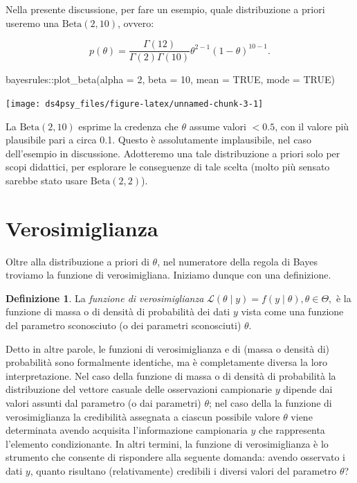 \documentclass[
  11pt,
]{krantz}
\makeatletter
\newenvironment{Shaded}{\begin{snugshade}}{\end{snugshade}}
\newcommand{\AttributeTok}[1]{\textcolor[rgb]{0.61,0.61,0.61}{#1}}
\newcommand{\ConstantTok}[1]{\textcolor[rgb]{0,0,0}{#1}}
\newcommand{\DecValTok}[1]{\textcolor[rgb]{0.06,0.06,0.06}{#1}}
\newcommand{\FunctionTok}[1]{\textcolor[rgb]{0,0,0}{#1}}
\newcommand{\NormalTok}[1]{#1}
\newcommand{\SpecialCharTok}[1]{\textcolor[rgb]{0,0,0}{#1}}
\newenvironment{kframe}{%
\medskip{}
\setlength{\fboxsep}{.8em}
 \def\at@end@of@kframe{}%
 \ifinner\ifhmode%
  \def\at@end@of@kframe{\end{minipage}}%
  \begin{minipage}{\columnwidth}%
 \fi\fi%
 \def\FrameCommand##1{\hskip\@totalleftmargin \hskip-\fboxsep
 \colorbox{shadecolor}{##1}\hskip-\fboxsep
     \hskip-\linewidth \hskip-\@totalleftmargin \hskip\columnwidth}%
 \MakeFramed {\advance\hsize-\width
   \@totalleftmargin\z@ \linewidth\hsize
   \@setminipage}}%
 {\par\unskip\endMakeFramed%
 \at@end@of@kframe}
\renewenvironment{Shaded}{\begin{kframe}}{\end{kframe}}
\theoremstyle{definition}
\newtheorem{definition}{Definizione}[chapter]
\theoremstyle{definition}
\theoremstyle{definition}
\theoremstyle{definition}
\theoremstyle{remark}
\makeatother
\begin{document}
Nella presente discussione, per fare un esempio, quale distribuzione a priori useremo una \(\mbox{Beta}(2, 10)\), ovvero:

\[
p(\theta) = \frac{\Gamma(12)}{\Gamma(2)\Gamma(10)}\theta^{2-1} (1-\theta)^{10-1}.
\]

\begin{Shaded}
\begin{Highlighting}[]
\NormalTok{bayesrules}\SpecialCharTok{::}\FunctionTok{plot\_beta}\NormalTok{(}\AttributeTok{alpha =} \DecValTok{2}\NormalTok{, }\AttributeTok{beta =} \DecValTok{10}\NormalTok{, }\AttributeTok{mean =} \ConstantTok{TRUE}\NormalTok{, }\AttributeTok{mode =} \ConstantTok{TRUE}\NormalTok{)}
\end{Highlighting}
\end{Shaded}

\begin{center}\texttt{[image: ds4psy\_files/figure-latex/unnamed-chunk-3-1]} \end{center}

\noindent La \(\mbox{Beta}(2, 10)\) esprime la credenza che \(\theta\) assume valori \(< 0.5\), con il valore più plausibile pari a circa 0.1. Questo è assolutamente implausibile, nel caso dell'esempio in discussione. Adotteremo una tale distribuzione a priori solo per scopi didattici, per esplorare le conseguenze di tale scelta (molto più sensato sarebbe stato usare \(\mbox{Beta}(2, 2)\)).

\hypertarget{verosimiglianza}{%
\section{Verosimiglianza}\label{verosimiglianza}}

Oltre alla distribuzione a priori di \(\theta\), nel numeratore della regola di Bayes troviamo la funzione di verosimigliana. Iniziamo dunque con una definizione.

\begin{definition}
La \emph{funzione di verosimiglianza} \(\mathcal{L}(\theta \mid y) = f(y \mid \theta), \theta \in \Theta,\) è la funzione di massa o di densità di probabilità dei dati \(y\) vista come una funzione del parametro sconosciuto (o dei parametri sconosciuti) \(\theta\).
\end{definition}

Detto in altre parole, le funzioni di verosimiglianza e di (massa o densità di) probabilità sono formalmente identiche, ma è completamente diversa la loro interpretazione. Nel caso della funzione di massa o di densità di probabilità la distribuzione del vettore casuale delle osservazioni campionarie \(y\) dipende dai valori assunti dal parametro (o dai parametri) \(\theta\); nel caso della la funzione di verosimiglianza la credibilità assegnata a ciascun possibile valore \(\theta\) viene determinata avendo acquisita l'informazione campionaria \(y\) che rappresenta l'elemento condizionante. In altri termini, la funzione di verosimiglianza è lo strumento che consente di rispondere alla seguente domanda: avendo osservato i dati \(y\), quanto risultano (relativamente) credibili i diversi valori del parametro \(\theta\)?
\end{document}
